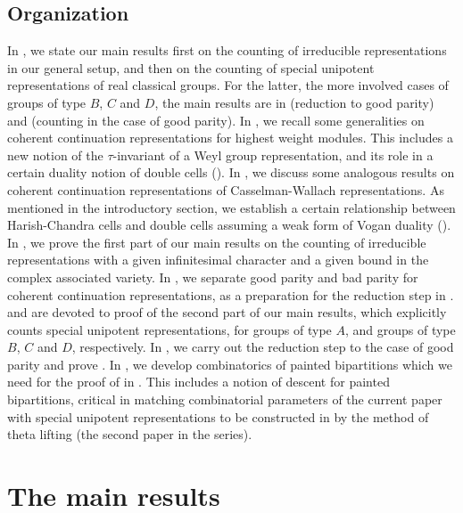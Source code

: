 \documentclass[12pt]{amsart}
\numberwithin{equation}{section}
\theoremstyle{remark}
\begin{document}
\subsection{Organization}
In , we state our main results first on the counting of irreducible representations in our general setup, and then on the counting of special unipotent representations of real classical groups. For the latter, the more involved cases of groups of type $B$, $C$ and $D$, the main results are in  (reduction to good parity) and  (counting in the case of good parity).
In , we recall some generalities on coherent continuation representations for highest weight modules. This includes a new notion of the $\tau$-invariant of a Weyl group representation, and its role in a certain duality notion of double cells (). In , we discuss some analogous results on coherent continuation representations of Casselman-Wallach representations. As mentioned in the introductory section, we establish a certain relationship between Harish-Chandra cells and double cells assuming a weak form of Vogan duality (). In , we prove the first part of our main results on the counting of irreducible representations with a given infinitesimal character and a given bound in the complex associated variety.
In , we separate good parity and bad parity for coherent continuation representations, as a preparation for the reduction step in .  and  are devoted to proof of the second part of our main results, which explicitly counts special unipotent representations, for groups of type $A$, and groups of type $B$, $C$ and $D$, respectively. In , we carry out the reduction step to the case of good parity and prove . In , we develop combinatorics of painted bipartitions which we need for the proof of  in . This includes a notion of descent for painted bipartitions, critical in matching combinatorial parameters of the current paper with special unipotent representations to be constructed in \cite{BMSZ2} by the method of theta lifting (the second paper in the series).

\section{The main results}\label{sec:main}
\end{document}
